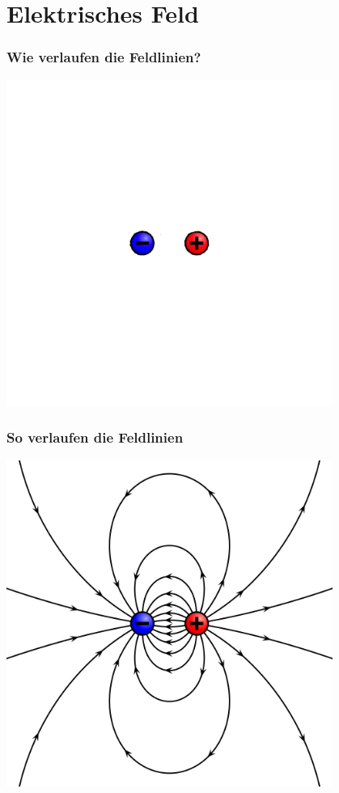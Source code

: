 \section*{Elektrisches Feld}

\begin{frame}
  \frametitle{Wie verlaufen die Feldlinien?}
  \begin{center}
    \includegraphics[width=0.8\textwidth,height=.8\textheight,keepaspectratio]{a08/VFPt_dipole_electric_ohne.png}
    {\tiny \hyperlink{refs}{\cite{wm}}}
  \end{center}
\end{frame}

\begin{frame}
  \frametitle{So verlaufen die Feldlinien}
  \begin{center}
    \includegraphics[width=0.8\textwidth,height=.8\textheight,keepaspectratio]{a08/VFPt_dipole_electric_mit.png}
    {\tiny \hyperlink{refs}{\cite{wm}}}
  \end{center}
\end{frame}

